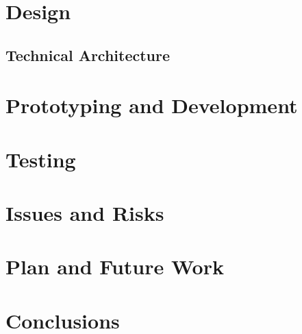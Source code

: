 \documentclass[a4paper, 12pt]{article}
\begin{document}
\section{Design}
\subsection{Technical Architecture}
\section{Prototyping and Development}
\section{Testing}
\section{Issues and Risks}
\section{Plan and Future Work}
\section{Conclusions}
\end{document}
